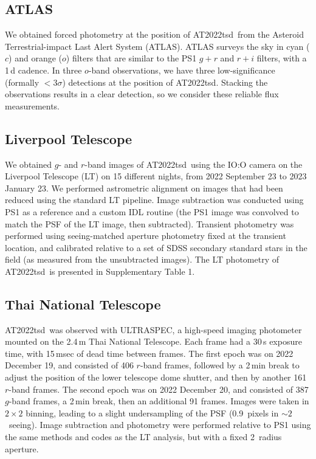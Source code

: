 \documentclass{nature_plusfigure}
\newcommand{\at}{AT2022tsd}
\begin{document}
\begin{methods}
\subsection{ATLAS}
\label{sec:atlas}

We obtained forced photometry at the position of \at\ from the Asteroid Terrestrial-impact Last Alert System (ATLAS\cite{Tonry2018,Smith2020,Shingles2021}).
ATLAS surveys the sky in cyan ($c$) and orange ($o$) filters that are similar to the PS1 $g+r$ and $r+i$ filters,
with a 1\,d cadence.
In three $o$-band observations, we have three low-significance (formally $<3\sigma$) detections at the position of \at.
Stacking the observations results in a clear detection, so we consider these reliable flux measurements.

\subsection{Liverpool Telescope}
\label{Methods: LT}

We obtained $g$- and $r$-band images of \at\ using the IO:O camera on the Liverpool Telescope\cite{Steele2004} (LT) on 15 different nights, from 2022 September 23 to 2023 January 23. We performed astrometric alignment on images that had been reduced using the standard LT pipeline.  Image subtraction was conducted using PS1 as a reference and a custom IDL routine (the PS1 image was convolved to match the PSF of the LT image, then subtracted).  Transient photometry was performed using seeing-matched aperture photometry fixed at the transient location, and calibrated relative to a set of SDSS secondary standard stars in the field (as measured from the unsubtracted images). The LT photometry of \at\ is presented in Supplementary Table 1.

\subsection{Thai National Telescope}
\label{sec:ultraspec}

\at\ was observed with ULTRASPEC\cite{Dhillon2014}, a high-speed imaging photometer mounted on the 2.4\,m Thai National Telescope. Each frame had a 30\,s exposure time, with 15\,msec of dead time between frames. The first epoch was on 2022 December 19, and consisted of 406 $r$-band frames, followed by a 2\,min break to adjust the position of the lower telescope dome shutter, and then by another 161 $r$-band frames. The second epoch was on 2022 December 20, and consisted of 387 $g$-band frames, a 2\,min break, then an additional 91 frames.  Images were taken in $2\times2$ binning, leading to a slight undersampling of the PSF (0.9\arcsec\ pixels in $\sim 2$\arcsec\ seeing).  Image subtraction and photometry were performed relative to PS1 using the same methods and codes as the LT analysis, but with a fixed 2\arcsec\ radius aperture.


\end{methods}
\end{document}

